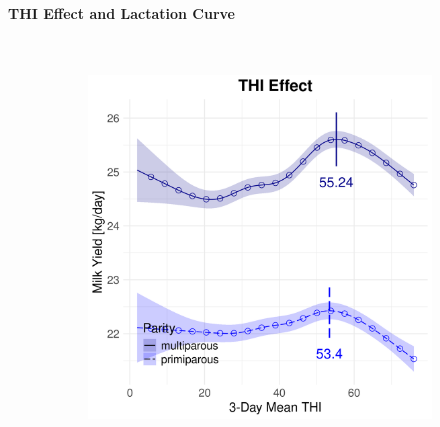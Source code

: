 \paragraph{THI Effect and Lactation Curve} \quad \\
\begin{figure}[H]
    \centering
    \begin{subfigure}[b]{0.45\textwidth}
        \centering
        \includegraphics[width=\textwidth]{thesis/figures/models/milk/before2010/ho_milk_before2010/ho_milk_before2010_marginal_thi_milk_combined.png}
    \end{subfigure}
    \hspace{0.05\textwidth} %
    \begin{subfigure}[b]{0.45\textwidth}
        \centering

\end{subfigure}
\end{figure}

